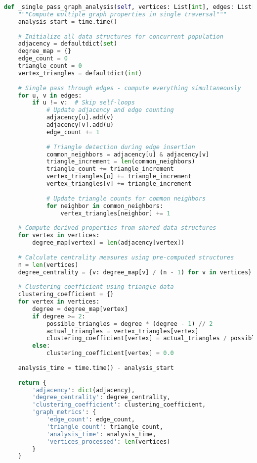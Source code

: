 \begin{lstlisting}[language=Python, caption=Single-Pass Multi-Property Graph Analysis]
def _single_pass_graph_analysis(self, vertices: List[int], edges: List[Tuple[int, int]]) -> Dict[str, Any]:
    """Compute multiple graph properties in single traversal"""
    analysis_start = time.time()
    
    # Initialize all data structures for concurrent population
    adjacency = defaultdict(set)
    degree_map = {}
    edge_count = 0
    triangle_count = 0
    vertex_triangles = defaultdict(int)
    
    # Single pass through edges - compute everything simultaneously
    for u, v in edges:
        if u != v:  # Skip self-loops
            # Update adjacency and edge counting
            adjacency[u].add(v)
            adjacency[v].add(u)
            edge_count += 1
            
            # Triangle detection during edge insertion
            common_neighbors = adjacency[u] & adjacency[v]
            triangle_increment = len(common_neighbors)
            triangle_count += triangle_increment
            vertex_triangles[u] += triangle_increment
            vertex_triangles[v] += triangle_increment
            
            # Update triangle counts for common neighbors
            for neighbor in common_neighbors:
                vertex_triangles[neighbor] += 1
    
    # Compute derived properties from shared data structures
    for vertex in vertices:
        degree_map[vertex] = len(adjacency[vertex])
    
    # Calculate centrality measures using pre-computed structures
    n = len(vertices)
    degree_centrality = {v: degree_map[v] / (n - 1) for v in vertices} if n > 1 else {}
    
    # Clustering coefficient using triangle data
    clustering_coefficient = {}
    for vertex in vertices:
        degree = degree_map[vertex]
        if degree >= 2:
            possible_triangles = degree * (degree - 1) // 2
            actual_triangles = vertex_triangles[vertex]
            clustering_coefficient[vertex] = actual_triangles / possible_triangles
        else:
            clustering_coefficient[vertex] = 0.0
    
    analysis_time = time.time() - analysis_start
    
    return {
        'adjacency': dict(adjacency),
        'degree_centrality': degree_centrality,
        'clustering_coefficient': clustering_coefficient,
        'graph_metrics': {
            'edge_count': edge_count,
            'triangle_count': triangle_count,
            'analysis_time': analysis_time,
            'vertices_processed': len(vertices)
        }
    }
\end{lstlisting}

